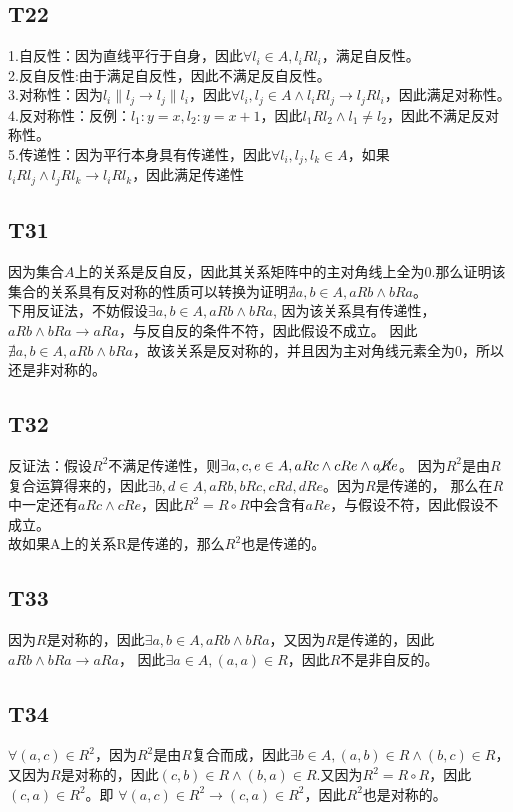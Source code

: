 \documentclass{article}
\begin{document}
\subsection{T22}
1.自反性：因为直线平行于自身，因此$\forall l_i \in A, l_i R l_i$，满足自反性。\\
2.反自反性:由于满足自反性，因此不满足反自反性。\\
3.对称性：因为$l_i \parallel l_j \rightarrow l_j \parallel l_i$，因此$\forall l_i, l_j \in A \land l_i R l_j \rightarrow
l_j R l_i$，因此满足对称性。\\
4.反对称性：反例：$l_1:y = x, l_2: y = x + 1$，因此$l_1 R l_2 \land l_1 \neq l_2$，因此不满足反对称性。\\
5.传递性：因为平行本身具有传递性，因此$\forall l_i, l_j, l_k \in A$，如果$l_i R l_j \land l_j R l_k \rightarrow l_i R l_k$，因此满足传递性
\subsection{T31}
因为集合$A$上的关系是反自反，因此其关系矩阵中的主对角线上全为0.那么证明该集合的关系具有反对称的性质可以转换为证明$\nexists a, b \in A, a R b \land b R a$。\\
下用反证法，不妨假设$\exists a, b \in A, a R b \land b R a$,
因为该关系具有传递性，$a R b \land b R a \rightarrow a R a$，与反自反的条件不符，因此假设不成立。
因此$\nexists a, b \in A, a R b \land b R a$，故该关系是反对称的，并且因为主对角线元素全为0，所以还是非对称的。
\subsection{T32}
反证法：假设$R^2$不满足传递性，则$\exists a, c, e \in A, a R c \land c R e \land a \cancel{R} e$。
因为$R^2$是由$R$复合运算得来的，因此$\exists b, d \in A, a R b, b R c, c R d, d R e$。因为$R$是传递的，
那么在$R$中一定还有$a R c \land c R e$，因此$R^2 = R \circ R$中会含有$a R e$，与假设不符，因此假设不成立。\\
故如果A上的关系R是传递的，那么$R^2$也是传递的。
\subsection{T33}
因为$R$是对称的，因此$\exists a, b \in A, aRb \land bRa$，又因为$R$是传递的，因此$aRb \land bRa \rightarrow aRa$，
因此$\exists a \in A, (a, a) \in R$，因此$R$不是非自反的。
\subsection{T34}
$\forall (a, c) \in R^2$，因为$R^2$是由$R$复合而成，因此$\exists b \in A, (a, b) \in R \land (b, c) \in R$，
又因为$R$是对称的，因此$(c, b) \in R \land (b, a) \in R$.又因为$R^2 = R \circ R$，因此$(c, a) \in R^2$。即
$\forall (a, c) \in R^2 \rightarrow (c, a) \in R^2$，因此$R^2$也是对称的。
\end{document}

